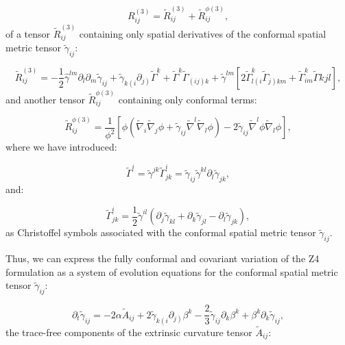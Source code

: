 \documentclass{article}
\begin{document}
\begin{equation}
R_{i j}^{\left( 3 \right)} = \tilde{R}_{i j}^{\left( 3 \right)} + \tilde{R}_{i j}^{\phi \left( 3 \right)},
\end{equation}
of a tensor ${\tilde{R}_{i j}^{\left( 3 \right)}}$ containing only spatial derivatives of the conformal spatial metric tensor ${\tilde{\gamma}_{i j}}$:

\begin{equation}
\tilde{R}_{i j}^{\left( 3 \right)} = - \frac{1}{2} \hat{\gamma}^{l m} \partial_l \partial_m \tilde{\gamma}_{i j} + \tilde{\gamma}_{k \left( i \right.} \partial_{\left. j \right)} \tilde{\Gamma}^{k} + \tilde{\Gamma}^{k} \tilde{\Gamma}_{\left( i j \right) k} + \tilde{\gamma}^{l m} \left[ 2 \tilde{\Gamma}_{l \left( i \right.}^{k} \tilde{\Gamma}_{\left. j \right) k m} + \tilde{\Gamma}_{i m}^{k} \tilde{\Gamma}{k j l} \right],
\end{equation}
and another tensor ${\tilde{R}_{i j}^{\phi \left( 3 \right)}}$ containing only conformal terms:

\begin{equation}
\tilde{R}_{i j}^{\phi \left( 3 \right)} = \frac{1}{\phi^2} \left[ \phi \left( \tilde{\nabla}_i \tilde{\nabla}_j \phi + \tilde{\gamma}_{i j} \tilde{\nabla}^l \tilde{\nabla}_l \phi \right) - 2 \tilde{\gamma}_{i j} \tilde{\nabla}^l \phi \tilde{\nabla}_l \phi \right],
\end{equation}
where we have introduced:

\begin{equation}
\tilde{\Gamma}^i = \tilde{\gamma}^{j k} \tilde{\Gamma}_{j k}^{i} = \tilde{\gamma}_{i j} \tilde{\gamma}^{k l} \partial_l \tilde{\gamma}_{j k},
\end{equation}
and:

\begin{equation}
\tilde{\Gamma}_{j k}^{i} = \frac{1}{2} \tilde{\gamma}^{i l} \left( \partial_j \tilde{\gamma}_{k l} + \partial_k \tilde{\gamma}_{j l} - \partial_l \tilde{\gamma}_{j k} \right),
\end{equation}
as Christoffel symbols associated with the conformal spatial metric tensor ${\tilde{\gamma}_{i j}}$.

Thus, we can express the fully conformal and covariant variation of the Z4 formulation as a system of evolution equations for the conformal spatial metric tensor ${\tilde{\gamma}_{i j}}$:

\begin{equation}
\partial_t \tilde{\gamma}_{i j} = -2 \alpha \tilde{A}_{i j} + 2 \tilde{\gamma}_{k \left( i \right.} \partial_{\left. j \right)} \beta^k - \frac{2}{3} \tilde{\gamma}_{i j} \partial_k \beta^k + \beta^k \partial_k \tilde{\gamma}_{i j},
\end{equation}
the trace-free components of the extrinsic curvature tensor ${\tilde{A}_{i j}}$:
\end{document}
